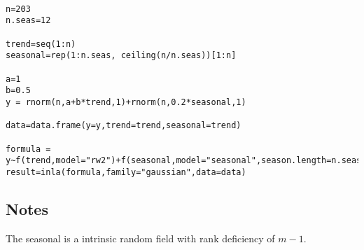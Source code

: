 \documentclass[a4paper,11pt]{article}
\begin{document}
\begin{verbatim}

n=203
n.seas=12

trend=seq(1:n)
seasonal=rep(1:n.seas, ceiling(n/n.seas))[1:n]

a=1
b=0.5
y = rnorm(n,a+b*trend,1)+rnorm(n,0.2*seasonal,1)

data=data.frame(y=y,trend=trend,seasonal=trend)

formula = y~f(trend,model="rw2")+f(seasonal,model="seasonal",season.length=n.seas,param=c(1,0.1))
result=inla(formula,family="gaussian",data=data)

\end{verbatim}


\subsection*{Notes}

The seasonal is a intrinsic random field with rank deficiency of $m-1$.
\end{document}
